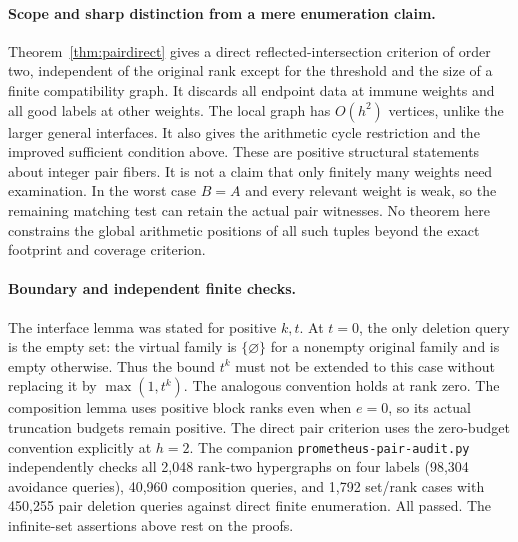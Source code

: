\documentclass[11pt]{article}
\theoremstyle{remark}\newtheorem{remark}[theorem]{Remark}
\begin{document}
\paragraph{Scope and sharp distinction from a mere enumeration claim.}
Theorem~\ref{thm:pairdirect} gives a direct reflected-intersection criterion of order two, independent of the original rank except for the threshold and the size of a finite compatibility graph. It discards all endpoint data at immune weights and all good labels at other weights. The local graph has $O(h^2)$ vertices, unlike the larger general interfaces. It also gives the arithmetic cycle restriction and the improved sufficient condition above. These are positive structural statements about integer pair fibers. It is not a claim that only finitely many weights need examination. In the worst case $B=A$ and every relevant weight is weak, so the remaining matching test can retain the actual pair witnesses. No theorem here constrains the global arithmetic positions of all such tuples beyond the exact footprint and coverage criterion.

\paragraph{Boundary and independent finite checks.}
The interface lemma was stated for positive $k,t$. At $t=0$, the only deletion query is the empty set: the virtual family is $\{\varnothing\}$ for a nonempty original family and is empty otherwise. Thus the bound $t^k$ must not be extended to this case without replacing it by $\max(1,t^k)$. The analogous convention holds at rank zero. The composition lemma uses positive block ranks even when $e=0$, so its actual truncation budgets remain positive. The direct pair criterion uses the zero-budget convention explicitly at $h=2$. The companion \texttt{prometheus-pair-audit.py} independently checks all 2,048 rank-two hypergraphs on four labels (98,304 avoidance queries), 40,960 composition queries, and 1,792 set/rank cases with 450,255 pair deletion queries against direct finite enumeration. All passed. The infinite-set assertions above rest on the proofs.
\end{document}
